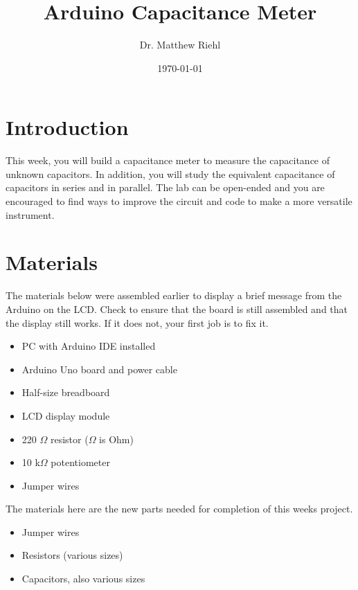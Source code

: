 \documentclass[]{article}
\title{Arduino Capacitance Meter}
\author{Dr. Matthew Riehl}
\date {\today}
\begin{document}
\newcommand{\ds}{\displaystyle}
\maketitle

\section{Introduction}

This week, you will build a capacitance meter  to measure the capacitance of unknown capacitors.  In addition, you will study the equivalent capacitance of capacitors in series and in parallel.  The lab can be open-ended and you are encouraged to find ways to improve the circuit and code to make a more versatile instrument.

\section{Materials}
The materials below were assembled earlier to display a brief message from the Arduino on the LCD.  Check to ensure that the board is still assembled and that the display still works.  If it does not, your first job is to fix it.
\begin{itemize}
	\item PC with Arduino IDE installed
	\item Arduino Uno board and power cable
	\item Half-size breadboard
	\item LCD display module
	\item 220 $\Omega$ resistor ($\Omega$ is Ohm)
	\item 10 k$\Omega$ potentiometer
	\item Jumper wires
\end{itemize}
The materials here are the new parts needed for completion of this weeks project.
\begin{itemize}
	\item Jumper wires
	\item Resistors (various sizes)
	\item Capacitors, also various sizes
\end{itemize}
\end{document}
